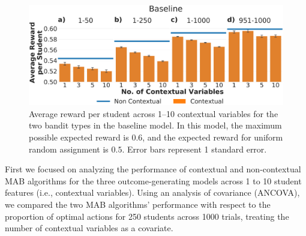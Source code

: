 \begin{figure}[ht]
    \centering
    \includegraphics[width=\columnwidth]{figs/NumConVarsRanges.pdf}
    \caption{Average reward per student across 1--10 contextual variables for the two bandit types in the baseline model. In this model, the maximum possible expected reward is $0.6$, and the expected reward for uniform random assignment is $0.5$.
    Error bars represent 1 standard error.}
    \label{fig:NumConVarsRanges}
\end{figure}

First we focused on analyzing the performance of contextual and non-contextual MAB algorithms for the three outcome-generating models across 1 to 10 student features (i.e., contextual variables).
Using an analysis of covariance (ANCOVA), we compared the two MAB algorithms' performance with respect to the proportion of optimal actions for 250 students across 1000 trials, treating the number of contextual variables as a covariate.


